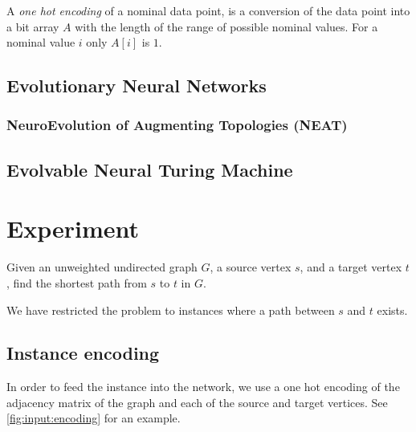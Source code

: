 \documentclass{article}
\begin{document}
A \textit{one hot encoding} of a nominal data point, is a conversion of the data point into a bit array $ A $ with the length of the range of possible nominal values. For a nominal value $ i $ only $ A[i] $ is $ 1 $.  

\subsection{Evolutionary Neural Networks}

\subsubsection{NeuroEvolution of Augmenting Topologies (NEAT)}

\subsection{Evolvable Neural Turing Machine}

\section{Experiment}
Given an unweighted undirected graph $G$, a source vertex $s$, and a target vertex $t$, find the shortest path from $s$ to $t$ in $G$.

We have restricted the problem to instances where a path between $s$ and $t$ exists.

\subsection{Instance encoding}
In order to feed the instance into the network, we use a one hot encoding of the adjacency matrix of the graph and each of the source and target vertices. See \autoref{fig:input:encoding} for an example.
\end{document}
